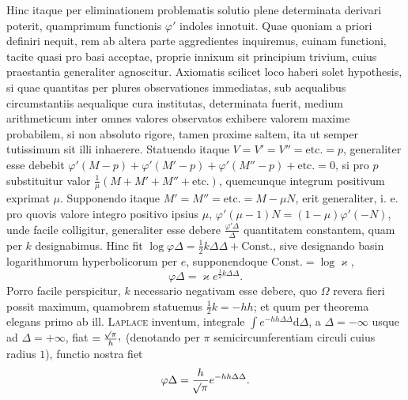 Hinc itaque per eliminationem problematis solutio plene determinata derivari
poterit, quamprimum functionis $\varphi'$ indoles innotuit. Quae quoniam a
priori definiri nequit, rem ab altera parte aggredientes inquiremus, cuinam
functioni, tacite quasi pro basi acceptae, proprie innixum sit
principium trivium, cuius praestantia generaliter agnoscitur. Axiomatis
scilicet loco haberi solet hypothesis, si quae quantitas per plures
observationes immediatas, sub aequalibus circumstantiis aequalique cura
institutas, determinata fuerit, medium arithmeticum inter omnes valores
observatos exhibere valorem maxime probabilem, si non absoluto rigore, tamen
proxime saltem, ita ut semper tutissimum sit illi inhaerere. Statuendo itaque
$V=V'=V''=\text{etc.}=p$, generaliter esse debebit
$\varphi'(M-p)+\varphi'(M'-p)+\varphi'(M''-p)+\text{etc.}=0$, si pro $p$
substituitur valor $\frac{1}{\mu}(M+M'+M''+\text{etc.})$, quemcunque integrum
positivum exprimat $\mu$. Supponendo itaque $M'=M''=\text{etc.}=M-\mu N$,
erit generaliter, i. e. pro quovis valore integro positivo ipsius $\mu$,
$\varphi'(\mu-1)N=(1-\mu)\varphi'(-N)$, unde facile colligitur, generaliter
esse debere $\frac{\varphi'\Delta}{\Delta}$ quantitatem constantem, quam per
$k$ designabimus. Hinc fit $\log\varphi\Delta=\tfrac12 k\Delta\Delta+\text{Const.}$,
sive designando basin logarithmorum hyperbolicorum per $e$, supponendoque
$\text{Const.}=\log\varkappa$,
\[
\varphi\Delta=\varkappa e^{\frac12 k\Delta\Delta}.
\]
Porro facile perspicitur, $k$ necessario negativam esse debere, quo $\Omega$
revera fieri possit maximum, quamobrem statuemus $\tfrac12 k=-hh$; et quum
per theorema elegans primo ab ill. \textsc{Laplace} inventum, integrale
$\int e^{-hh\Delta\Delta}\mathrm{d}\Delta$, a $\Delta=-\infty$ usque ad
$\Delta=+\infty$, fiat $=\frac{\BareRoot{\pi}}{h}\mathpunct{\raisebox{.45ex}{,}}$
(denotando per $\pi$ semicircumferentiam circuli cuius radius $1$), functio
nostra fiet
\[
\varphi\Delta=\frac{h}{\mathord{{}^{}\!\surd}\pi}e^{-hh\Delta\Delta}.
\]
